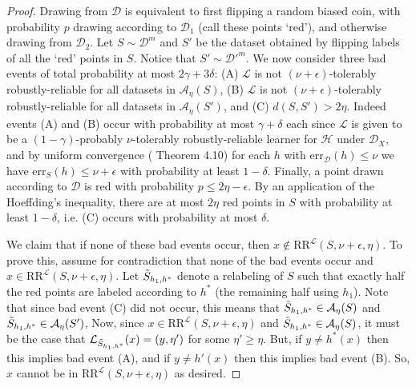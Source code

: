\documentclass[11pt]{article}
\newcommand{\CR}{\text{RR}}
\newcommand{\err}{\mathrm{err}}
\newcommand{\0}{\mathbf{0}}
\newcommand{\1}{\mathbf{1}}
\newcommand{\cA}{\mathcal{A}}
\newcommand{\cD}{\mathcal{D}}
\newcommand{\cH}{\mathcal{H}}
\newcommand{\cL}{\mathcal{L}}
\begin{document}
\begin{proof}
Drawing from $\cD$ is equivalent to first flipping a random biased coin, with probability $p$ drawing according to $\cD_1$ (call these points `red'), and otherwise drawing from $\cD_2$. Let $S \sim \cD^m$ and $S'$ be the dataset obtained by flipping labels of all the `red' points in $S$. Notice that $S'\sim\cD'^m$. We now consider three bad events of total probability at most $2\gamma+3\delta$: (A) $\cL$ is not $(\nu+\epsilon)$-tolerably robustly-reliable for all datasets in $\cA_\eta(S)$, (B) $\cL$ is not $(\nu+\epsilon)$-tolerably robustly-reliable for all datasets in $\cA_\eta(S')$, and (C) $d(S,S') > 2\eta$.  Indeed events (A) and (B) occur with probability at most $\gamma+\delta$ each since $\cL$ is given to be a $(1-\gamma)$-probably $\nu$-tolerably robustly-reliable learner for $\cH$ under $\cD_X$, and by uniform convergence (\cite{anthony2009neural} Theorem 4.10) for each $h$ with $\err_\cD(h)\le \nu$ we have $\err_S(h)\le \nu+\epsilon$ with probability at least $1-\delta$. Finally, a point drawn according to $\cD$ is red with probability $p\le 2\eta-\epsilon$. By an application of the Hoeffding's inequality, there are at most $2\eta$ red points in $S$ with probability at least $1-\delta$, i.e. (C) occurs with probability at most $\delta$.

We claim that if none of these bad events occur, then $x \not\in \CR^\cL(S,\nu+\epsilon,\eta)$.
To prove this, assume for contradiction that none of the bad events occur and $x \in \CR^\cL(S,\nu+\epsilon,\eta)$. Let $\Tilde{S}_{h_1,h^*}$ denote a relabeling of $S$ such that exactly half the red points are labeled according to $h^*$ (the remaining half using $h_1$). Note that since bad event (C) did not occur, this means that $\Tilde{S}_{h_1,h^*} \in \cA_\eta(S)$ and $\Tilde{S}_{h_1,h^*} \in \cA_\eta(S')$,  Now, since $x \in \CR^\cL(S,\nu+\epsilon,\eta)$ and $\Tilde{S}_{h_1,h^*} \in \cA_\eta(S)$, it must be the case that $\cL_{\Tilde{S}_{h_1,h^*}}(x) = (y,\eta')$ for some $\eta'\geq \eta$. But, if $y \neq h^*(x)$ then this implies bad event (A), and if $y \neq h'(x)$ then this implies bad event (B).  So, $x$ cannot be in $\CR^\cL(S,\nu+\epsilon,\eta)$ as desired.
\end{proof}
\end{document}
